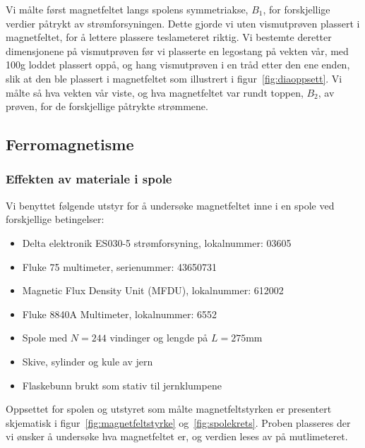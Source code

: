 \documentclass[a4paper,11pt, twocolumn]{article}
\begin{document}
Vi målte først magnetfeltet langs spolens symmetriakse, $B_1$, for forskjellige verdier påtrykt av strømforsyningen. Dette gjorde vi uten vismutprøven plassert i magnetfeltet, for å lettere plassere teslameteret riktig. Vi bestemte deretter dimensjonene på vismutprøven før vi plasserte en legostang på vekten vår, med 100g loddet plassert oppå, og hang vismutprøven i en tråd etter den ene enden, slik at den ble plassert i magnetfeltet som illustrert i figur~\ref{fig:diaoppsett}. Vi målte så hva vekten vår viste, og hva magnetfeltet var rundt toppen, $B_2$, av prøven, for de forskjellige påtrykte strømmene.
\subsection{Ferromagnetisme}

\subsubsection{Effekten av materiale i spole}
Vi benyttet følgende utstyr for å undersøke magnetfeltet inne i en spole ved forskjellige betingelser:
\begin{itemize}
	\item Delta elektronik ES030-5 strømforsyning, lokalnummer: 03605
	\item Fluke 75 multimeter, serienummer: 43650731
	\item Magnetic Flux Density Unit (MFDU), lokalnummer: 612002
	\item Fluke 8840A Multimeter, lokalnummer: 6552
	\item Spole med $N=244$ vindinger og lengde på $L=275$mm
	\item Skive, sylinder og kule av jern
	\item Flaskebunn brukt som stativ til jernklumpene
\end{itemize}
Oppsettet for spolen og utstyret som målte magnetfeltstyrken er presentert skjematisk i figur~\ref{fig:magnetfeltstyrke} og~\ref{fig:spolekrets}. Proben plasseres der vi ønsker å undersøke hva magnetfeltet er, og verdien leses av på mutlimeteret.
\end{document}
